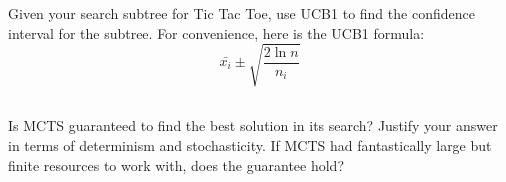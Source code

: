 \documentclass[paper=a4, fontsize=11pt]{scrartcl}
\numberwithin{equation}{section} %
\numberwithin{figure}{section} %
\numberwithin{table}{section} %
\begin{document}
\section{}

Given your search subtree for Tic Tac Toe, use UCB1 to find the confidence interval for the subtree. For convenience, here is the UCB1 formula:
\begin{equation}
	\bar{x_i} \pm \sqrt{\frac{2 \ln n}{n_i}}
\end{equation}

\subsection{}
Is MCTS guaranteed to find the best solution in its search? Justify your answer in terms of determinism and stochasticity. If MCTS had fantastically large but finite resources to work with, does the guarantee hold? 
\end{document}
